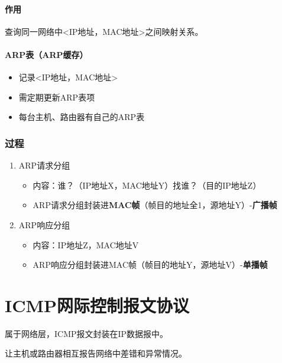 \paragraph{作用}
查询同一网络中<IP地址，MAC地址>之间映射关系。


\paragraph{ARP表（ARP缓存）}
\begin{itemize}
    \item 记录<IP地址，MAC地址>
    \item 需定期更新ARP表项
    \item 每台主机、路由器有自己的ARP表
\end{itemize}

\subsubsection{过程}

\begin{enumerate}
    \item ARP请求分组\begin{itemize}
        \item 内容：谁？（IP地址X，MAC地址Y）找谁？（目的IP地址Z）
        \item ARP请求分组封装进\textbf{MAC帧}（帧目的地址全1，源地址Y）-\textbf{广播帧}
    \end{itemize}
    \item ARP响应分组\begin{itemize}
        \item 内容：IP地址Z，MAC地址V
        \item ARP响应分组封装进MAC帧（帧目的地址Y，源地址V）-\textbf{单播帧}
    \end{itemize}
\end{enumerate}


\section{ICMP网际控制报文协议}
属于网络层，ICMP报文封装在IP数据报中。

让主机或路由器相互报告网络中差错和异常情况。

